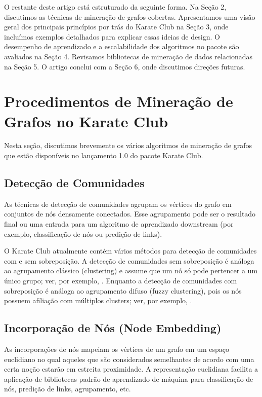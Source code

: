 \documentclass[sigconf]{acmart}
\begin{document}
O restante deste artigo está estruturado da seguinte forma. Na Seção 2, discutimos as técnicas de mineração de grafos cobertas. Apresentamos uma visão geral dos principais princípios por trás do Karate Club na Seção 3, onde incluímos exemplos detalhados para explicar essas ideias de design. O desempenho de aprendizado e a escalabilidade dos algoritmos no pacote são avaliados na Seção 4. Revisamos bibliotecas de mineração de dados relacionadas na Seção 5. O artigo conclui com a Seção 6, onde discutimos direções futuras.

\section{Procedimentos de Mineração de Grafos no Karate Club}

Nesta seção, discutimos brevemente os vários algoritmos de mineração de grafos que estão disponíveis no lançamento 1.0 do pacote Karate Club.

\subsection{Detecção de Comunidades}

As técnicas de detecção de comunidades agrupam os vértices do grafo em conjuntos de nós densamente conectados. Esse agrupamento pode ser o resultado final ou uma entrada para um algoritmo de aprendizado downstream (por exemplo, classificação de nós ou predição de links).

O Karate Club atualmente contém vários métodos para detecção de comunidades com e sem sobreposição. A detecção de comunidades sem sobreposição é análoga ao agrupamento clássico (clustering) e assume que um nó só pode pertencer a um único grupo; ver, por exemplo, \cite{EdMot, SCD, LabelProp, GEMSEC}. Enquanto a detecção de comunidades com sobreposição é análoga ao agrupamento difuso (fuzzy clustering), pois os nós possuem afiliação com múltiplos clusters; ver, por exemplo, \cite{SymmNMF, NNSED, M-NMF, DANMF}.

\subsection{Incorporação de Nós (Node Embedding)}

As incorporações de nós mapeiam os vértices de um grafo em um espaço euclidiano no qual aqueles que são considerados semelhantes de acordo com uma certa noção estarão em estreita proximidade. A representação euclidiana facilita a aplicação de bibliotecas padrão de aprendizado de máquina para classificação de nós, predição de links, agrupamento, etc.
\end{document}
